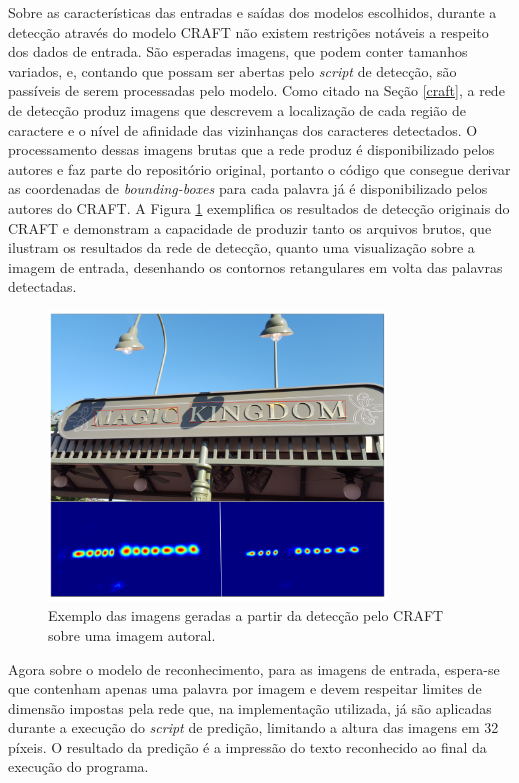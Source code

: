 Sobre as características das entradas e saídas dos modelos escolhidos, durante a detecção através do modelo CRAFT não existem restrições notáveis a 
respeito dos dados de entrada. São esperadas imagens, que podem conter tamanhos variados, e, contando que possam ser abertas pelo \textit{script} de 
detecção, são passíveis de serem processadas pelo modelo. Como citado na Seção \ref{craft}, a rede de detecção produz imagens que descrevem a localização 
de cada região de caractere e o nível de afinidade das vizinhanças dos caracteres detectados. O processamento dessas imagens brutas que a rede produz é 
disponibilizado pelos autores e faz parte do repositório original, portanto o código que consegue derivar as coordenadas de \textit{bounding-boxes} 
para cada palavra já é disponibilizado pelos autores do CRAFT. A Figura \ref{fig:methodology_craft_example} exemplifica os resultados de detecção originais 
do CRAFT e demonstram a capacidade de produzir tanto os arquivos brutos, que ilustram os resultados da rede de detecção, quanto uma visualização sobre a 
imagem de entrada, desenhando os contornos retangulares em volta das palavras detectadas.

\begin{figure}
    \centering
    \includegraphics[width=0.8\textwidth]{figs/craft-exmaple.png}
    \caption{Exemplo das imagens geradas a partir da detecção pelo CRAFT sobre uma imagem autoral.}
    \label{fig:methodology_craft_example}
\end{figure}

Agora sobre o modelo de reconhecimento, para as imagens de entrada, espera-se que contenham apenas uma palavra por imagem e devem respeitar limites de 
dimensão impostas pela rede que, na implementação utilizada, já são aplicadas durante a execução do \textit{script} de predição, limitando a altura das 
imagens em 32 píxeis. O resultado da predição é a impressão do texto reconhecido ao final da execução do programa. 

